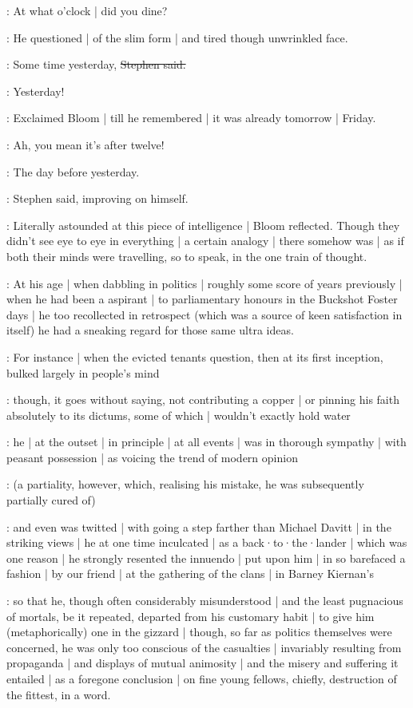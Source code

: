\Bloom:
At what o'clock |
did you dine?

:
He questioned |
of the slim form |
and tired though unwrinkled face.

\Stephen:
Some time yesterday,
\sout{Stephen said.}

\Bloom:
Yesterday!

:
Exclaimed Bloom |
till he remembered |
it was already tomorrow |
Friday.

\Bloom:
Ah,
you mean it's after twelve!

\Stephen:
The day before yesterday.

:
Stephen said,
improving on himself.

:
Literally astounded at this piece of intelligence |
Bloom reflected.
Though they didn't see eye to eye in everything |
a certain analogy |
there somehow was |
as if both their minds were travelling,
so to speak,%
in the one train of thought.

:
At his age |
when dabbling in politics |
roughly some score of years previously |
when he had been a  aspirant |
to parliamentary honours in the Buckshot Foster days |
he too recollected in retrospect
(which was a source of keen satisfaction in itself)
he had a sneaking regard for those same ultra ideas.

:
For instance |
when the evicted tenants question,
then at its first inception,
bulked largely in people's mind

:
though,
it goes without saying,
not contributing a copper |
or pinning his faith absolutely to its dictums,
some of which |
wouldn't exactly hold water

:
he |
at the outset |
in principle |
at all events |
was in thorough sympathy |
with peasant possession |
as voicing the trend of modern opinion%

:
(a partiality,
however,
which,
realising his mistake,
he was subsequently partially cured of)

:
and even was twitted |
with going a step farther than Michael Davitt |
in the striking views |
he at one time inculcated |
as a back·to·the·lander |
which was one reason |
he strongly resented the innuendo |
put upon him |
in so barefaced a fashion |
by our friend |
at the gathering of the clans |
in Barney Kiernan's

:
so that he,
though often considerably misunderstood |
and the least pugnacious of mortals,
be it repeated,
departed from his customary habit |
to give him
(metaphorically)
one in the gizzard |
though,
so far as politics themselves were concerned,
he was only too conscious of the casualties |
invariably resulting from propaganda |
and displays of mutual animosity |
and the misery and suffering it entailed |
as a foregone conclusion |
on fine young fellows,
chiefly,
destruction of the fittest,
in a word.

